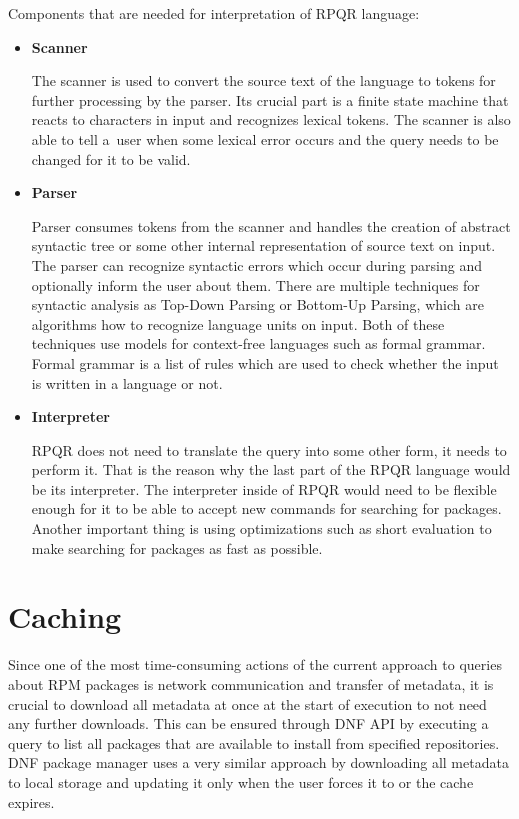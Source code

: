 Components that are needed for interpretation of RPQR language:
\begin{itemize}
  \item \textbf{Scanner}

  The scanner is used to convert the source text of the language to tokens for further processing by the parser.
  Its crucial part is a finite state machine that reacts to characters in input and recognizes lexical
  tokens. The scanner is also able to tell a~user when some lexical error occurs and the query needs to be
  changed for it to be valid.
  
  \item \textbf{Parser}
  
  Parser consumes tokens from the scanner and handles the creation of abstract syntactic tree or some other
  internal representation of source text on input. The parser can recognize syntactic errors
  which occur during parsing and optionally inform the user about them. There are multiple techniques
  for syntactic analysis as Top-Down Parsing or Bottom-Up Parsing, which are algorithms
  how to recognize language units on input. Both of these techniques use models for context-free
  languages such as formal grammar. Formal grammar is a list of rules which are used to check
  whether the input is written in a language or not.

  \item \textbf{Interpreter}
  
  RPQR does not need to translate the query into some other form, it needs to perform it. That is the
  reason why the last part of the RPQR language would be its interpreter. The interpreter inside of RPQR would need to be
  flexible enough for it to be able to accept new commands for searching for packages. Another important thing is using optimizations such as short evaluation to make searching for packages
  as fast as possible.
\end{itemize}

\section{Caching}
Since one of the most time-consuming actions of the current approach to queries about RPM packages is
network communication and transfer of metadata, it is crucial to download all metadata at once at
the start of execution to not need any further downloads. This can be ensured through DNF API by
executing a query to list all packages that are available to install from specified repositories.
DNF package manager uses a very similar approach by downloading all metadata to local storage and
updating it only when the user forces it to or the cache expires.

